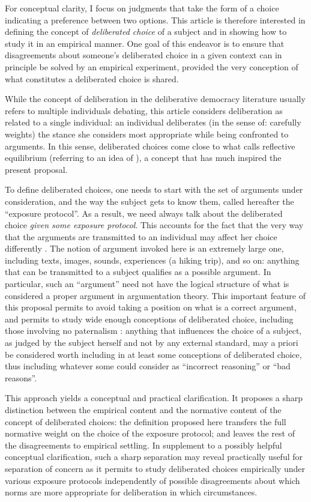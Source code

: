 \documentclass[version=last, pagesize, twoside=off, bibliography=totoc, DIV=calc, fontsize=12pt, a4paper, french, english]{scrartcl}
\begin{document}
For conceptual clarity, I focus on judgments that take the form of a choice indicating a preference between two options. 
This article is therefore interested in defining the concept of \emph{deliberated choice} of a subject and in showing how to study it in an empirical manner. 
One goal of this endeavor is to ensure that disagreements about someone’s deliberated choice in a given context can in principle be solved by an empirical experiment, provided the very conception of what constitutes a deliberated choice is shared.

While the concept of deliberation in the deliberative democracy literature usually refers to multiple individuals debating, this article considers deliberation as related to a single individual: an individual deliberates (in the sense of: carefully weights) the stance she considers most appropriate while being confronted to arguments. In this sense, deliberated choices come close to what \citet{rawls_theory_1999} calls reflective equilibrium (referring to an idea of \citet{goodman_fact_1983}), a concept that has much inspired the present proposal.

To define deliberated choices, one needs to start with the set of arguments under consideration, and the way the subject gets to know them, called hereafter the “exposure protocol”. 
As a result, we need always talk about the deliberated choice \emph{given some exposure protocol}. 
This accounts for the fact that the very way that the arguments are transmitted to an individual may affect her choice differently \citep{railton_facts_2003}. 
The notion of argument invoked here is an extremely large one, including texts, images, sounds, experiences (a hiking trip), and so on: anything that can be transmitted to a subject qualifies as a possible argument. In particular, such an “argument” need not have the logical structure of what is considered a proper argument in argumentation theory. This important feature of this proposal permits to avoid taking a position on what is a correct argument, and permits to study wide enough conceptions of deliberated choice, including those involving no paternalism \citep{cailloux_formal_2020}: anything that influences the choice of a subject, as judged by the subject herself and not by any external standard, may a priori be considered worth including in at least some conceptions of deliberated choice, thus including whatever some could consider as “incorrect reasoning” or “bad reasons”.

This approach yields a conceptual and practical clarification. It proposes a sharp distinction between the empirical content and the normative content of the concept of deliberated choices: the definition proposed here transfers the full normative weight on the choice of the exposure protocol; and leaves the rest of the disagreements to empirical settling. 
In supplement to a possibly helpful conceptual clarification, such a sharp separation may reveal practically useful for separation of concern as it permits to study deliberated choices empirically under various exposure protocols independently of possible disagreements about which norms are more appropriate for deliberation in which circumstances.
\end{document}
